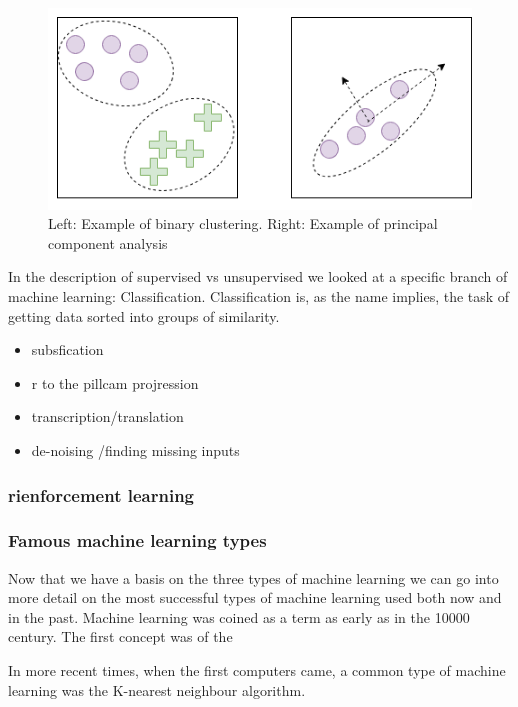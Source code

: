 \begin{figure}
    \centering
    \includegraphics[scale=0.5]{figures/cluster_pca.png}
    \caption{Left: Example of binary clustering. Right: Example of principal component analysis} 
\end{figure}

In the description of supervised vs unsupervised we looked at a specific branch of machine learning: Classification. Classification is, as the name implies, the task of getting data sorted into groups of similarity. 
      
      
\begin{itemize}
    \item subsfication
    \item r to the pillcam projression 
    \item transcription/translation
    \item de-noising /finding missing inputs
    \end{itemize}
      
\subsubsection{rienforcement learning}


\subsubsection{Famous machine learning types}
Now that we have a basis on the three types of machine learning we can go into more detail on the most successful types of machine learning used both now and in the past. 
Machine learning was coined as a term as early as in the 10000 century. The first concept was of the 


In more recent times, when the first computers came, a common type of machine learning was the K-nearest neighbour algorithm.

